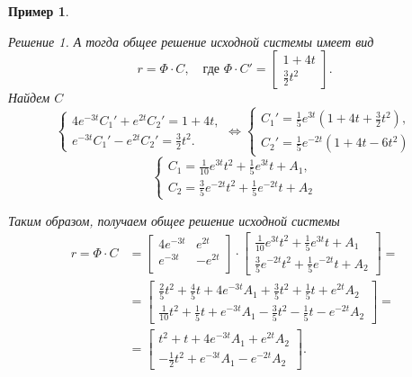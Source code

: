 \documentclass[a5paper, 11pt]{article}
\theoremstyle{definition}
\theoremstyle{plain}
\newtheorem{Ex}{Пример}
\theoremstyle{remark}
\newtheorem*{Solution}{Решение}
\begin{document}
\begin{Ex}
\begin{Solution}
			
			А тогда общее решение исходной системы имеет вид 
			\[
			r=  \Phi \cdot C, \quad \text{где } \Phi \cdot C' = \begin{bmatrix}
				1+4t\\\frac32 t^2
			\end{bmatrix}.
			\]
			Найдем $C$
			\[
			\begin{cases}
				4e^{-3t}C_1'+  e^{2t}C_2' = 1+4t ,\\
				e^{-3t}C_1' - e^{2t}C_2' = \frac32 t^2.
			\end{cases}
		\Leftrightarrow
			\begin{cases}
				C_1' = \frac15 e^{3t} (1+4t+\frac32 t^2),\\
				C_2' = \frac15 e^{-2t}  (1+4t-6t^2)
			\end{cases}
			\]
			\[
			\begin{cases}
			C_1 = \frac1{10} e^{3t} t^2 + \frac15 e^{3t} t + A_1, \\
			C_2 = \frac35 e^{-2t} t^2 + \frac15 e^{-2t} t + A_2
			\end{cases}
			\]
			
			Таким образом, получаем общее решение исходной системы
			\[
			\begin{split}
			r = \Phi \cdot C &= \begin{bmatrix}
				4e^{-3t} & e^{2t} \\
				e^{-3t} & -e^{2t} \\
			\end{bmatrix} \cdot \begin{bmatrix}
			\frac1{10} e^{3t} t^2 + \frac15 e^{3t} t + A_1 \\
			\frac35 e^{-2t} t^2 + \frac15 e^{-2t} t + A_2
		\end{bmatrix} = \\
	& =\begin{bmatrix}
		\frac25t^2 + \frac45 t + 4e^{-3t}A_1 + \frac3{5} t^2 + \frac15 t + e^{2t} A_2\\
		\frac1{10} t^2 + \frac15 t + e^{-3t}A_1 - \frac35 t^2 -\frac15 t - e^{-2t} A_2
	\end{bmatrix}=\\
			&= \begin{bmatrix}
				t^2 + t+ 4e^{-3t}A_1 + e^{2t}A_2\\
				-\frac12t^2 + e^{-3t}A_1- e^{-2t}A_2
			\end{bmatrix}.
		\end{split}
			\]
		\end{Solution}
	\end{Ex}
\end{document}
